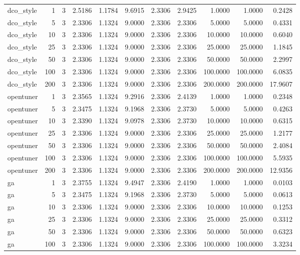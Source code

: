 \begin{table}[t]
\begin{tabular}{lrrrrrrrrrr}
dco\_style & 1 & 3 & 2.5186 & 1.1784 & 9.6915 & 2.3306 & 2.9425 & 1.0000 & 1.0000 & 0.2428 \\
dco\_style & 5 & 3 & 2.3306 & 1.1324 & 9.0000 & 2.3306 & 2.3306 & 5.0000 & 5.0000 & 0.4331 \\
dco\_style & 10 & 3 & 2.3306 & 1.1324 & 9.0000 & 2.3306 & 2.3306 & 10.0000 & 10.0000 & 0.6040 \\
dco\_style & 25 & 3 & 2.3306 & 1.1324 & 9.0000 & 2.3306 & 2.3306 & 25.0000 & 25.0000 & 1.1845 \\
dco\_style & 50 & 3 & 2.3306 & 1.1324 & 9.0000 & 2.3306 & 2.3306 & 50.0000 & 50.0000 & 2.2997 \\
dco\_style & 100 & 3 & 2.3306 & 1.1324 & 9.0000 & 2.3306 & 2.3306 & 100.0000 & 100.0000 & 6.0835 \\
dco\_style & 200 & 3 & 2.3306 & 1.1324 & 9.0000 & 2.3306 & 2.3306 & 200.0000 & 200.0000 & 17.9607 \\
opentuner & 1 & 3 & 2.3565 & 1.1324 & 9.2916 & 2.3306 & 2.4139 & 1.0000 & 1.0000 & 0.2348 \\
opentuner & 5 & 3 & 2.3475 & 1.1324 & 9.1968 & 2.3306 & 2.3730 & 5.0000 & 5.0000 & 0.4263 \\
opentuner & 10 & 3 & 2.3390 & 1.1324 & 9.0978 & 2.3306 & 2.3730 & 10.0000 & 10.0000 & 0.6315 \\
opentuner & 25 & 3 & 2.3306 & 1.1324 & 9.0000 & 2.3306 & 2.3306 & 25.0000 & 25.0000 & 1.2177 \\
opentuner & 50 & 3 & 2.3306 & 1.1324 & 9.0000 & 2.3306 & 2.3306 & 50.0000 & 50.0000 & 2.4084 \\
opentuner & 100 & 3 & 2.3306 & 1.1324 & 9.0000 & 2.3306 & 2.3306 & 100.0000 & 100.0000 & 5.5935 \\
opentuner & 200 & 3 & 2.3306 & 1.1324 & 9.0000 & 2.3306 & 2.3306 & 200.0000 & 200.0000 & 12.9356 \\
ga & 1 & 3 & 2.3755 & 1.1324 & 9.4947 & 2.3306 & 2.4190 & 1.0000 & 1.0000 & 0.0103 \\
ga & 5 & 3 & 2.3475 & 1.1324 & 9.1968 & 2.3306 & 2.3730 & 5.0000 & 5.0000 & 0.0613 \\
ga & 10 & 3 & 2.3306 & 1.1324 & 9.0000 & 2.3306 & 2.3306 & 10.0000 & 10.0000 & 0.1253 \\
ga & 25 & 3 & 2.3306 & 1.1324 & 9.0000 & 2.3306 & 2.3306 & 25.0000 & 25.0000 & 0.3312 \\
ga & 50 & 3 & 2.3306 & 1.1324 & 9.0000 & 2.3306 & 2.3306 & 50.0000 & 50.0000 & 0.6323 \\
ga & 100 & 3 & 2.3306 & 1.1324 & 9.0000 & 2.3306 & 2.3306 & 100.0000 & 100.0000 & 3.3234 \\

\end{tabular}
\end{table}
